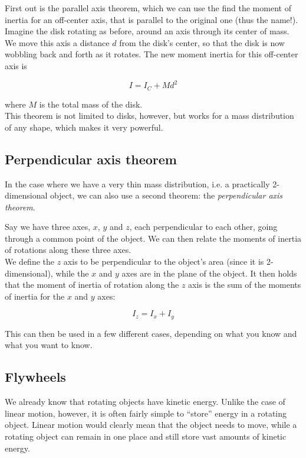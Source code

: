First out is the parallel axis theorem, which we can use the find the moment of inertia for an off-center axis, that is parallel to the original one (thus the name!).\\

Imagine the disk rotating as before, around an axis through its center of mass. We move this axis a distance $d$ from the disk's center, so that the disk is now wobbling back and forth as it rotates. The new moment inertia for this off-center axis is

\begin{equation}
I = I_C + M d^2
\end{equation}

where $M$ is the total mass of the disk.\\
This theorem is not limited to disks, however, but works for a mass distribution of any shape, which makes it very powerful.

\subsection{Perpendicular axis theorem}

In the case where we have a very thin mass distribution, i.e. a practically 2-dimensional object, we can also use a second theorem: the \emph{perpendicular axis theorem}.

Say we have three axes, $x$, $y$ and $z$, each perpendicular to each other, going through a common point of the object. We can then relate the moments of inertia of rotations along these three axes.\\
We define the $z$ axis to be perpendicular to the object's area (since it is 2-dimensional), while the $x$ and $y$ axes are in the plane of the object. It then holds that the moment of inertia of rotation along the $z$ axis is the sum of the moments of inertia for the $x$ and $y$ axes:

\begin{equation}
I_z = I_x + I_y
\end{equation}

This can then be used in a few different cases, depending on what you know and what you want to know.

\subsection{Flywheels}

We already know that rotating objects have kinetic energy. Unlike the case of linear motion, however, it is often fairly simple to ``store'' energy in a rotating object. Linear motion would clearly mean that the object needs to move, while a rotating object can remain in one place and still store vast amounts of kinetic energy.

